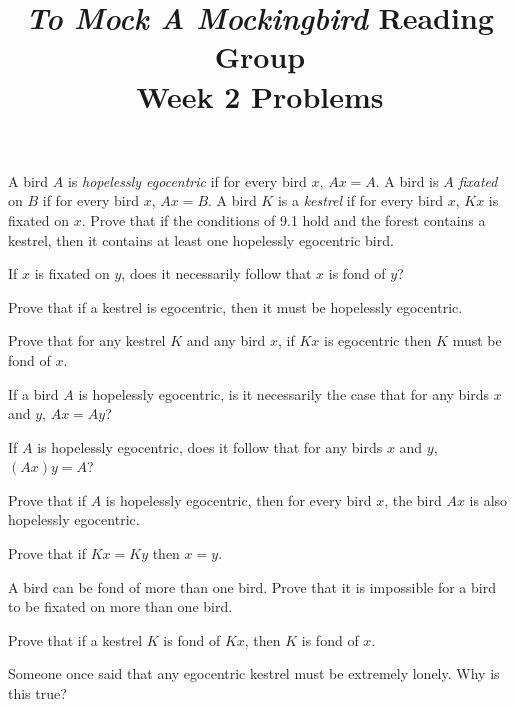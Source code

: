 \documentclass[12pt, letterpaper]{article}
\title{\emph{To Mock A Mockingbird} Reading Group\\Week 2 Problems}
\begin{document}
\maketitle

\begin{prob}{9.9}
A bird $A$ is \emph{hopelessly egocentric} if for every bird $x$, $Ax = A$. A bird is $A$ \emph{fixated} on $B$ if for every bird $x$, $Ax = B$. A bird $K$ is a \emph{kestrel} if for every bird $x$, $Kx$ is fixated on $x$. Prove that if the conditions of 9.1 hold and the forest contains a kestrel, then it contains at least one hopelessly egocentric bird.
\end{prob}

\begin{prob}{9.10}
If $x$ is fixated on $y$, does it necessarily follow that $x$ is fond of $y$?
\end{prob}

\begin{prob}{9.11}
Prove that if a kestrel is egocentric, then it must be hopelessly egocentric.
\end{prob}

\begin{prob}{9.12}
Prove that for any kestrel $K$ and any bird $x$, if $Kx$ is egocentric then $K$ must be fond of $x$.
\end{prob}

\begin{prob}{9.13}
If a bird $A$ is hopelessly egocentric, is it necessarily the case that for any birds $x$ and $y$, $Ax = Ay$?
\end{prob}

\begin{prob}{9.14}
If $A$ is hopelessly egocentric, does it follow that for any birds $x$ and $y$, $(Ax)y = A$?
\end{prob}

\begin{prob}{9.15}
Prove that if $A$ is hopelessly egocentric, then for every bird $x$, the bird $Ax$ is also hopelessly egocentric.
\end{prob}

\begin{prob}{9.16}
Prove that if $Kx = Ky$ then $x = y$.
\end{prob}

\begin{prob}{9.17}
A bird can be fond of more than one bird. Prove that it is impossible for a bird to be fixated on more than one bird.
\end{prob}

\begin{prob}{9.18}
Prove that if a kestrel $K$ is fond of $Kx$, then $K$ is fond of $x$.
\end{prob}

\begin{prob}{9.19}
Someone once said that any egocentric kestrel must be extremely lonely. Why is this true?
\end{prob}
\end{document}
